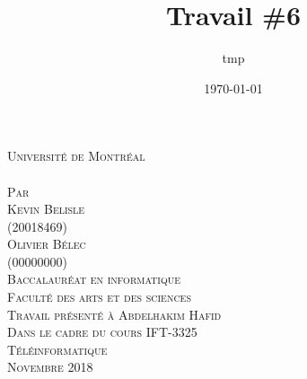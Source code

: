 \documentclass[a4paper,12pt]{article}
\date{\today}
\title{Travail \#6}
\author{tmp}
\newcommand{\Author}{Kevin Belisle}
\newcommand{\Authorr}{Olivier Bélec}
\newcommand{\MatriculeAuthor}{20018469}
\newcommand{\MatriculeAuthorr}{00000000}
\newcommand{\Teacher}{Abdelhakim Hafid}
\newcommand{\ClassNum}{IFT-3325}
\newcommand{\ClassName}{Téléinformatique}
\newcommand{\DateMMMMYYYY}{Novembre 2018}
\begin{document}
	\begin{titlepage} 
		\begin{center}
			\textsc{\normalsize Université de Montréal}\\[3cm]
			 
			\textsc{\LARGE \@title}\\[2.5cm]
			
			\textsc{\small Par}\\[0.25cm]
			\textsc{\LARGE \Author}\\[0.25cm]
			\textsc{\normalsize (\MatriculeAuthor)}\\[0.25cm]
			\textsc{\LARGE \Authorr}\\[0.25cm]
			\textsc{\normalsize (\MatriculeAuthorr)}\\[2.25cm]
			
			\textsc{\normalsize Baccalauréat en informatique}\\
			\textsc{\normalsize Faculté des arts et des sciences}\\[2.5cm]
			
			\textsc{\small Travail présenté à \Teacher}\\
			\textsc{\small Dans le cadre du cours \ClassNum}\\
			\textsc{\small \ClassName}\\[2.75cm]
			
			\textsc{\normalsize \DateMMMMYYYY}\\[1.5cm]
		\end{center}
	\end{titlepage}
\end{document}
